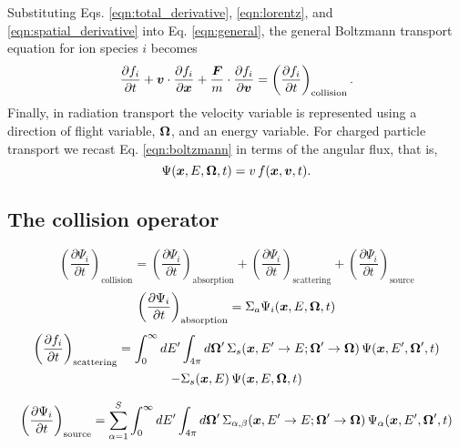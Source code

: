 \documentclass[../main.tex]{subfiles}
\begin{document}
Substituting Eqs. \eqref{eqn:total_derivative}, \eqref{eqn:lorentz}, and \eqref{eqn:spatial_derivative} into Eq. \eqref{eqn:general}, the general Boltzmann transport equation for ion species $i$ becomes
\begin{equation} \label{eqn:boltzmann}
  \dfrac{\partial f_i}{\partial t} + \Bv \cdot \dfrac{\partial f_i}{\partial \Bx} + \dfrac{\boldsymbol{F}}{m} \cdot \dfrac{\partial f_i}{\partial \Bv} = \left( \dfrac{\partial f_i}{\partial t} \right)_{\text{collision}}.
\end{equation}
Finally, in radiation transport the velocity variable is represented using a direction of flight variable, $\boldsymbol{\Omega}$, and an energy variable. For charged particle transport we recast Eq. \eqref{eqn:boltzmann} in terms of the angular flux, that is,
\begin{equation}
  \Psi(\boldsymbol{x},E,\boldsymbol{\Omega},t) = v \, f(\boldsymbol{x},\boldsymbol{v},t).
\end{equation}


\subsection{The collision operator}
\begin{equation}
  \left( \dfrac{\partial \Psi_i}{\partial t} \right)_{\text{collision}} = \left( \dfrac{\partial \Psi_i}{\partial t} \right)_{\text{absorption}} + \left( \dfrac{\partial \Psi_i}{\partial t} \right)_{\text{scattering}} + \left( \dfrac{\partial \Psi_i}{\partial t} \right)_{\text{source}}
\end{equation}
\begin{equation}
  \left( \dfrac{\partial \Psi_i}{\partial t} \right)_{\text{absorption}} = \Sigma_a \Psi_i(\boldsymbol{x},E,\boldsymbol{\Omega},t)
\end{equation}
\begin{multline}
  \left( \dfrac{\partial f_i}{\partial t} \right)_{\text{scattering}} = \int_{0}^{\infty} dE^{\prime} \int_{4\pi} d \boldsymbol{\Omega}^{\prime} \, \Sigma_s(\boldsymbol{x}, E^{\prime}\rightarrow E; \boldsymbol{\Omega}^{\prime} \rightarrow \boldsymbol{\Omega}) \, \Psi(\boldsymbol{x},E^{\prime},\boldsymbol{\Omega}^{\prime},t) \\
  - \Sigma_s(\boldsymbol{x},E) \, \Psi(\boldsymbol{x},E,\boldsymbol{\Omega},t)
\end{multline}

\begin{equation}
  \left( \dfrac{\partial \Psi_i}{\partial t} \right)_{\text{source}} = \sum_{\alpha=1}^S\int_{0}^{\infty} dE^{\prime} \int_{4\pi} d \boldsymbol{\Omega}^{\prime} \, \Sigma_{\alpha,\beta}(\boldsymbol{x}, E^{\prime}\rightarrow E; \boldsymbol{\Omega}^{\prime} \rightarrow \boldsymbol{\Omega}) \, \Psi_{\alpha}(\boldsymbol{x},E^{\prime},\boldsymbol{\Omega}^{\prime},t)
\end{equation}
\end{document}
